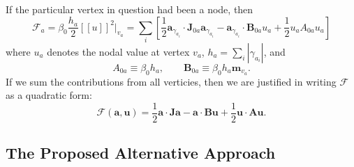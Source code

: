 \documentclass[12pt]{article}
\begin{document}
If the particular vertex in question had been a node, then
\begin{equation}
        \mathcal{F}_a = \beta_0 \frac{h_a}{2} [\![ u ]\!]^2 \bigg|_{v_a} = \sum_i \left[ \frac{1}{2} \mathbf{a}_{\gamma_{a_{i}}} \cdot \mathbf{J}_{0a} \mathbf{a}_{\gamma_{a_{i}}} - \mathbf{a}_{\gamma_{a_{i}}} \cdot \mathbf{B}_{0a} u_a + \frac{1}{2} u_a A_{0a} u_a \right]
\end{equation}
where $u_a$ denotes the nodal value at vertex $v_a$, $h_a = \sum_i |\gamma_{a_i}|$, and
\begin{equation}
	A_{0a} \equiv \beta_0 h_a, \qquad \mathbf{B}_{0a} \equiv \beta_0 h_a \mathbf{m}_{v_a}.
\end{equation}
If we sum the contributions from all verticies, then we are justified in writing $\mathcal{F}$ as a quadratic form:
\begin{equation}
        \mathcal{F} (\mathbf{a}, \mathbf{u}) = \frac{1}{2} \mathbf{a} \cdot \mathbf{J} \mathbf{a} - \mathbf{a} \cdot \mathbf{B} \mathbf{u} + \frac{1}{2} \mathbf{u} \cdot \mathbf{A} \mathbf{u}.
\end{equation}

\subsection*{The Proposed Alternative Approach}
\end{document}
